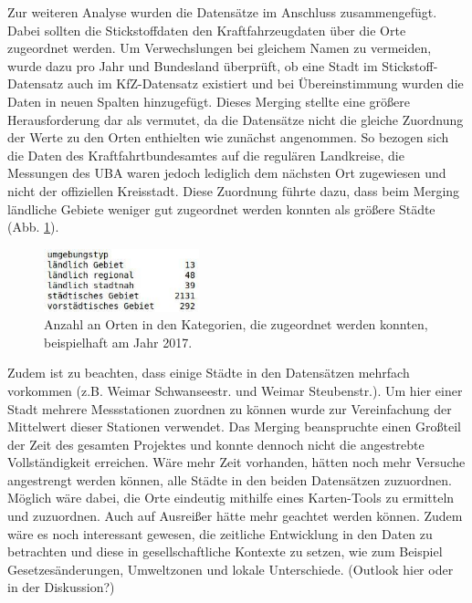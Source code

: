 \documentclass[11pt,a4paper,oneside,german]{article}
\begin{document}
	Zur weiteren Analyse wurden die Datensätze im Anschluss zusammengefügt. Dabei sollten die Stickstoffdaten den Kraftfahrzeugdaten über die Orte zugeordnet werden. Um Verwechslungen bei gleichem Namen zu vermeiden, wurde dazu pro Jahr und Bundesland überprüft, ob eine Stadt im Stickstoff-Datensatz auch im KfZ-Datensatz existiert und bei Übereinstimmung wurden die Daten in neuen Spalten hinzugefügt. Dieses Merging stellte eine größere Herausforderung dar als vermutet, da die Datensätze nicht die gleiche Zuordnung der Werte zu den Orten enthielten wie zunächst angenommen. So bezogen sich die Daten des Kraftfahrtbundesamtes auf die regulären Landkreise, die Messungen des UBA waren jedoch lediglich dem nächsten Ort zugewiesen und nicht der offiziellen Kreisstadt. Diese Zuordnung führte dazu, dass beim Merging ländliche Gebiete weniger gut zugeordnet werden konnten als größere Städte (Abb. \ref{fig:Kategorien}).\\
	
	\begin{figure}
		\vspace{-20pt}
		\begin{center}
			\includegraphics[width=4.5cm]{Kategorien.jpg}
			\caption{Anzahl an Orten in den Kategorien, die zugeordnet werden konnten, beispielhaft am Jahr 2017.}
			\label{fig:Kategorien}
		\end{center}
		\vspace{-20pt}
	\end{figure}
	
	Zudem ist zu beachten, dass einige Städte in den Datensätzen mehrfach vorkommen (z.B. Weimar Schwanseestr. und Weimar Steubenstr.). Um hier einer Stadt mehrere Messstationen zuordnen zu können wurde zur Vereinfachung der Mittelwert dieser Stationen verwendet. Das Merging beanspruchte einen Großteil der Zeit des gesamten Projektes und konnte dennoch nicht die angestrebte Vollständigkeit erreichen. Wäre mehr Zeit vorhanden, hätten noch mehr Versuche angestrengt werden können, alle Städte in den beiden Datensätzen zuzuordnen. Möglich wäre dabei, die Orte eindeutig mithilfe eines Karten-Tools zu ermitteln und zuzuordnen. Auch auf Ausreißer hätte mehr geachtet werden können. Zudem wäre es noch interessant gewesen, die zeitliche Entwicklung in den Daten zu betrachten und diese in gesellschaftliche Kontexte zu setzen, wie zum Beispiel Gesetzesänderungen, Umweltzonen und lokale Unterschiede. (Outlook hier oder in der Diskussion?)
	
\end{document}
